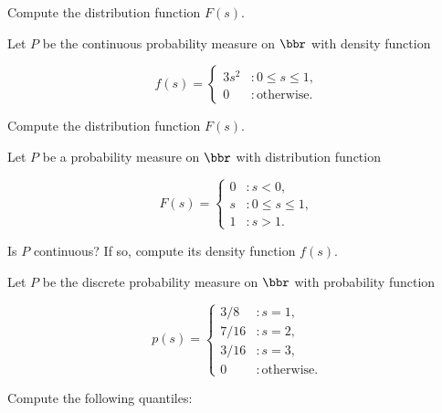 \documentclass[12pt,reqno]{amsart}
\begin{document}
Compute the distribution function $F(s)$.\vfill
















\prob Let $P$ be the continuous probability measure on $\bbr$ with density function

    \[f(s) = \begin{cases}
        3s^2 & : 0 \leq s \leq 1, \\
        0 & : \text{otherwise}.
    \end{cases}\]

Compute the distribution function $F(s)$.\vfill
















\prob Let $P$ be a probability measure on $\bbr$ with distribution function

    \[F(s) = \begin{cases}
        0 & : s < 0, \\
        s & : 0\leq s \leq 1, \\
        1 & : s>1.
    \end{cases}\]

Is $P$ continuous? If so, compute its density function $f(s)$.\vfill


















\newpage
\prob Let $P$ be the discrete probability measure on $\bbr$ with probability function

    \[p(s) = \begin{cases}
        3/8 & : s=1, \\
        7/16 & : s=2, \\
        3/16 & : s=3, \\
        0 & : \text{otherwise}.
    \end{cases}\]

Compute the following quantiles:
\end{document}
